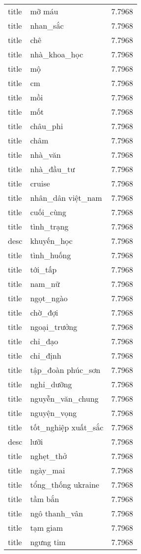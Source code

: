 \documentclass{article}
\begin{document}
\begin{tabular}{lll}
title & mỡ máu & 7.7968\\
title & nhan\_sắc & 7.7968\\
title & chê & 7.7968\\
title & nhà\_khoa\_học & 7.7968\\
title & mộ & 7.7968\\
title & cm & 7.7968\\
title & mồi & 7.7968\\
title & mốt & 7.7968\\
title & châu\_phi & 7.7968\\
title & châm & 7.7968\\
title & nhà\_văn & 7.7968\\
title & nhà\_đầu\_tư & 7.7968\\
title & cruise & 7.7968\\
title & nhân\_dân việt\_nam & 7.7968\\
title & cuối\_cùng & 7.7968\\
title & tình\_trạng & 7.7968\\
desc & khuyến\_học & 7.7968\\
title & tình\_huống & 7.7968\\
title & tới\_tấp & 7.7968\\
title & nam\_nữ & 7.7968\\
title & ngọt\_ngào & 7.7968\\
title & chờ\_đợi & 7.7968\\
title & ngoại\_trưởng & 7.7968\\
title & chỉ\_đạo & 7.7968\\
title & chỉ\_định & 7.7968\\
title & tập\_đoàn phúc\_sơn & 7.7968\\
title & nghỉ\_dưỡng & 7.7968\\
title & nguyễn\_văn\_chung & 7.7968\\
title & nguyện\_vọng & 7.7968\\
title & tốt\_nghiệp xuất\_sắc & 7.7968\\
desc & lưỡi & 7.7968\\
title & nghẹt\_thở & 7.7968\\
title & ngày\_mai & 7.7968\\
title & tổng\_thống ukraine & 7.7968\\
title & tầm bắn & 7.7968\\
title & ngô thanh\_vân & 7.7968\\
title & tạm giam & 7.7968\\
title & ngưng tim & 7.7968\\

\end{tabular}
\end{document}
